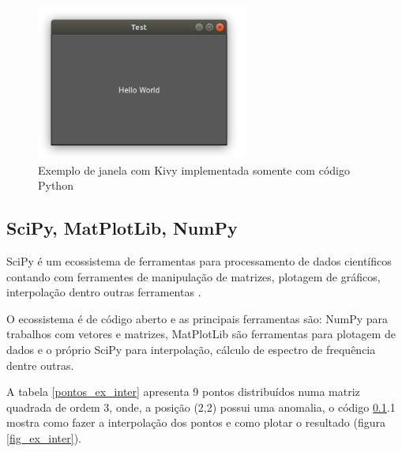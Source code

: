             \begin{figure}[H]
                \caption{Exemplo de janela com Kivy implementada somente com código Python}
                \begin{center}
                    \includegraphics[width=7cm]{texto/fig/hello_world_kivy.png} 
                \end{center}
                \label{janela_kivy} 
            \end{figure}


            
            \subsection{SciPy, MatPlotLib, NumPy}
            \label{lim_scipy}
            
            SciPy é um ecossistema de ferramentas para processamento de dados científicos contando com ferramentes de manipulação de matrizes, plotagem de gráficos, interpolação dentro outras ferramentas \cite{scipy}.
            
            O ecossistema é de código aberto e as principais ferramentas são: NumPy para trabalhos com vetores e matrizes, MatPlotLib são ferramentas para plotagem de dados e o próprio SciPy para interpolação, cálculo de espectro de frequência dentre outras.
            
            A tabela \ref{pontos_ex_inter} apresenta 9 pontos distribuídos numa matriz quadrada de ordem 3, onde, a posição (2,2) possui uma anomalia, o código \ref{lim_scipy}.1 mostra como fazer a interpolação dos pontos e como plotar o resultado (figura \ref{fig_ex_inter}).
            
